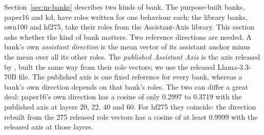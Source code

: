 Section~\ref{sec:m-banks} describes two kinds of bank.
The purpose-built banks, paper16 and kd, have roles written for one behaviour each; the library banks, own100 and hf275, take their roles from the Assistant-Axis library. %
This section asks whether the kind of bank matters.
Two reference directions are needed. %
A bank's own \emph{assistant direction} is the mean vector of its assistant anchor minus the mean over all its other roles. %
The \emph{published Assistant Axis} is the axis released by \textcite[p.~6]{lu2026assistant}, built the same way from their role vectors; we use the released Llama-3.3-70B file. %
The published axis is one fixed reference for every bank, whereas a bank's own direction depends on that bank's roles. %
The two can differ a great deal: paper16's own direction has a cosine of only 0.2997 to 0.3719 with the published axis at layers 20, 22, 40 and 60. %
For hf275 they coincide: the direction rebuilt from the 275 released role vectors has a cosine of at least 0.9999 with the released axis at those layers. %

